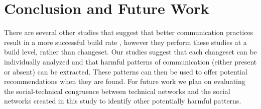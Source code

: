 \documentclass[conference]{IEEEtran}
\begin{document}
\section{Conclusion and Future Work}
There are several other studies that suggest that better communication practices result in a more successful build rate \cite{Wolf:2009:PBF:1555001.1555017}\cite{Schroter:2010:PBO:1810295.1810456}\cite{4721184}, however they perform these studies at a build level, rather than changeset.  Our studies suggest that each changeset can be individually analyzed and that harmful patterns of communication (either present or absent) can be extracted.  These patterns can then be used to offer potential recommendations when they are found.  For future work we plan on evaluating the social-technical congruence between technical networks and the social networks created in this study to identify other potentially harmful patterns.




\end{document}
